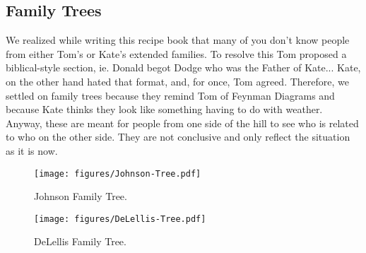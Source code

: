 \documentclass[12pt]{article}
\begin{document}
\subsection{Family Trees}

{\color{red}
We realized while writing this recipe book that many of you don't know people from either Tom's or Kate's extended families.  To resolve this Tom proposed a biblical-style section, ie. Donald begot Dodge who was the Father of Kate...  Kate, on the other hand hated that format, and, for once, Tom agreed.  Therefore, we settled on family trees because they remind Tom of Feynman Diagrams and because Kate thinks they look like something having to do with weather.  Anyway, these are meant for people from one side of the hill to see who is related to who on the other side.
They are not conclusive and only reflect the situation as it is now.
}

\begin{figure}
    \centering
    \texttt{[image: figures/Johnson-Tree.pdf]}
    \caption{Johnson Family Tree.}
    \label{fig:johnson-tree}
\end{figure}

\begin{figure}
    \centering
    \texttt{[image: figures/DeLellis-Tree.pdf]}
    \caption{DeLellis Family Tree.}
    \label{fig:delellis-tree}
\end{figure}

\printindex

\end{document}
